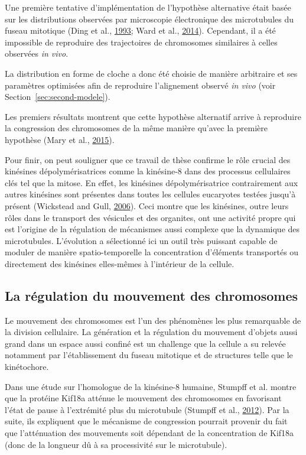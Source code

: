 \documentclass[12pt,a4paper,twoside,openright]{book}
\begin{document}
Une première tentative d'implémentation de l'hypothèse alternative était
basée sur les distributions observées par microscopie électronique des
microtubules du fuseau mitotique (Ding et al.,
\protect\hyperlink{ref-Ding1993a}{1993}; Ward et al.,
\protect\hyperlink{ref-Ward2014}{2014}). Cependant, il a été impossible
de reproduire des trajectoires de chromosomes similaires à celles
observées \emph{in vivo}.

La distribution en forme de cloche a donc été choisie de manière
arbitraire et ses paramètres optimisées afin de reproduire l'alignement
observé \emph{in vivo} (voir Section~\ref{sec:second-modele}).

Les premiers résultats montrent que cette hypothèse alternatif arrive à
reproduire la congression des chromosomes de la même manière qu'avec la
première hypothèse (Mary et al.,
\protect\hyperlink{ref-Mary2015}{2015}).

Pour finir, on peut souligner que ce travail de thèse confirme le rôle
crucial des kinésines dépolymérisatrices comme la kinésine-8 dans des
processus cellulaires clés tel que la mitose. En effet, les kinésines
dépolymérisatrice contrairement aux autres kinésines sont présentes dans
toutes les cellules eucaryotes testées jusqu'à présent (Wickstead and
Gull, \protect\hyperlink{ref-Wickstead2006}{2006}). Ceci montre que les
kinésines, outre leurs rôles dans le transport des vésicules et des
organites, ont une activité propre qui est l'origine de la régulation de
mécanismes aussi complexe que la dynamique des microtubules. L'évolution
a sélectionné ici un outil très puissant capable de moduler de manière
spatio-temporelle la concentration d'éléments transportés ou directement
des kinésines elles-mêmes à l'intérieur de la cellule.

\subsection{La régulation du mouvement des
chromosomes}\label{la-ruxe9gulation-du-mouvement-des-chromosomes}

Le mouvement des chromosomes est l'un des phénomènes les plus
remarquable de la division cellulaire. La génération et la régulation du
mouvement d'objets aussi grand dans un espace aussi confiné est un
challenge que la cellule a su relevée notamment par l'établissement du
fuseau mitotique et de structures telle que le kinétochore.

Dans une étude sur l'homologue de la kinésine-8 humaine, Stumpff et al.
montre que la protéine Kif18a atténue le mouvement des chromosomes en
favorisant l'état de pause à l'extrémité plus du microtubule (Stumpff et
al., \protect\hyperlink{ref-Stumpff2012}{2012}). Par la suite, ils
expliquent que le mécanisme de congression pourrait provenir du fait que
l'atténuation des mouvements soit dépendant de la concentration de
Kif18a (donc de la longueur dû à sa processivité sur le microtubule).
\end{document}
